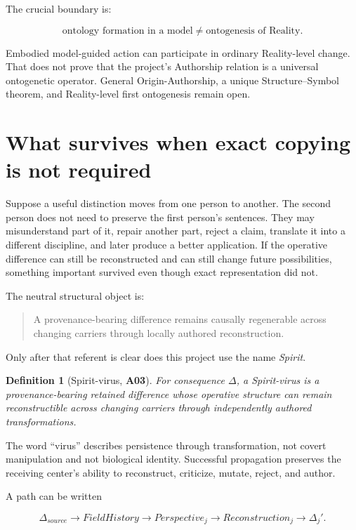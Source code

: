 \documentclass[11pt]{article}
\newtheorem{definition}{Definition}
\newcommand{\claim}[1]{\textsf{\textbf{#1}}}
\begin{document}
The crucial boundary is:

\begin{equation}
\text{ontology formation in a model}\neq\text{ontogenesis of Reality}.
\end{equation}

Embodied model-guided action can participate in ordinary Reality-level change. That does not prove that the project's Authorship relation is a universal ontogenetic operator. General Origin-Authorship, a unique Structure--Symbol theorem, and Reality-level first ontogenesis remain open.

\section{What survives when exact copying is not required}

Suppose a useful distinction moves from one person to another. The second person does not need to preserve the first person's sentences. They may misunderstand part of it, repair another part, reject a claim, translate it into a different discipline, and later produce a better application. If the operative difference can still be reconstructed and can still change future possibilities, something important survived even though exact representation did not.

The neutral structural object is:

\begin{quote}
A provenance-bearing difference remains causally regenerable across changing carriers through locally authored reconstruction.
\end{quote}

Only after that referent is clear does this project use the name \emph{Spirit}.

\begin{definition}[Spirit-virus, \claim{A03}]
For consequence $\Delta$, a Spirit-virus is a provenance-bearing retained difference whose operative structure can remain reconstructible across changing carriers through independently authored transformations.
\end{definition}

The word ``virus'' describes persistence through transformation, not covert manipulation and not biological identity. Successful propagation preserves the receiving center's ability to reconstruct, criticize, mutate, reject, and author.

A path can be written

\begin{equation}
\Delta_{source}\rightarrow FieldHistory\rightarrow Perspective_j
\rightarrow Reconstruction_j\rightarrow\Delta_j'.
\end{equation}
\end{document}
